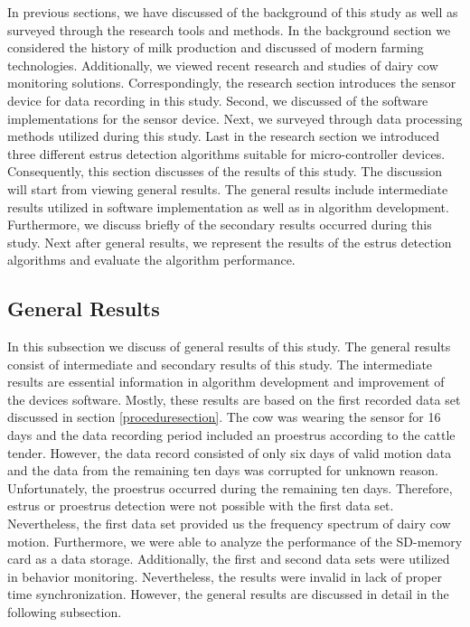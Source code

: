 \documentclass[english,12pt,a4paper,pdftex,elec,utf8]{aaltothesis}
\begin{document}
In previous sections, we have discussed of the background of this study as well as surveyed through the research tools and methods. In the background section we considered the history of milk production and discussed of modern farming technologies. Additionally, we viewed recent research and studies of dairy cow monitoring solutions. Correspondingly, the research section introduces the sensor device for data recording in this study. Second, we discussed of the software implementations for the sensor device. Next, we surveyed through data processing methods utilized during this study. Last in the research section we introduced three different estrus detection algorithms suitable for micro-controller devices. Consequently, this section discusses of the results of this study. The discussion will start from viewing general results. The general results include intermediate results utilized in software implementation as well as in algorithm development. Furthermore, we discuss briefly of the secondary results occurred during this study. Next after general results, we represent the results of the estrus detection algorithms and evaluate the algorithm performance. 
 
\subsection{General Results} \label{generalresultssection}

In this subsection we discuss of general results of this study. The general results consist of intermediate and secondary results of this study. The intermediate results are essential information in algorithm development and improvement of the devices software. Mostly, these results are based on the first recorded data set discussed in section \ref{proceduresection}. The cow was wearing the sensor for 16 days and the data recording period included an proestrus according to the cattle tender. However, the data record consisted of only six days of valid motion data and the data from the remaining ten days was corrupted for unknown reason. Unfortunately, the proestrus occurred during the remaining ten days. Therefore, estrus or proestrus detection were not possible with the first data set. Nevertheless, the first data set provided us the frequency spectrum of dairy cow motion. Furthermore, we were able to analyze the performance of the SD-memory card as a data storage. Additionally, the first and second data sets were utilized in behavior monitoring. Nevertheless, the results were invalid in lack of proper time synchronization. However, the general results are discussed in detail in the following subsection.
\end{document}
